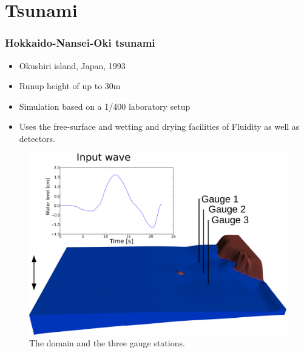 \section{Tsunami}

\begin{frame}
    \frametitle{Hokkaido-Nansei-Oki tsunami}
\begin{minipage}[]{0.5\linewidth} 
\begin{itemize}
\item Okushiri island, Japan, 1993 
\item Runup height of up to 30m
\item Simulation based on a 1/400 laboratory setup 
\item Uses the free-surface and wetting and drying facilities of Fluidity as well as detectors.
\end{itemize}
\end{minipage}
\hspace{0.5cm}
\begin{minipage}[]{0.4\linewidth} 
\begin{figure}
\begin{center}
\includegraphics[width=\textwidth]{hokkaido-nansei-oki_tsunami/MonaiValleyDomainWithInputWave2_png.pdf}
\end{center}
\caption{The domain and the three gauge stations.}\label{fig:monai_inputwave}
\end{figure}
\end{minipage}
\end{frame}

